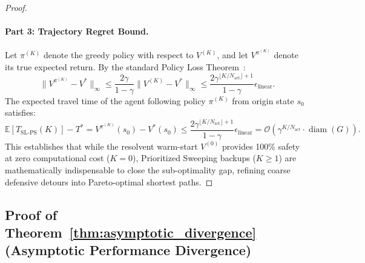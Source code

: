 \documentclass[11pt,a4paper]{article}
\begin{document}
\begin{proof}
\paragraph{Part 3: Trajectory Regret Bound.}
Let $\pi^{(K)}$ denote the greedy policy with respect to $V^{(K)}$, and let $V^{\pi^{(K)}}$ denote its true expected return. By the standard Policy Loss Theorem~\cite{sutton2018reinforcement}:
\begin{equation}
\|V^{\pi^{(K)}} - V^*\|_\infty \le \frac{2 \gamma}{1 - \gamma} \|V^{(K)} - V^*\|_\infty \le \frac{2 \gamma^{\lfloor K / N_{\text{act}} \rfloor + 1}}{1 - \gamma} \epsilon_{\text{linear}}.
\end{equation}
The expected travel time of the agent following policy $\pi^{(K)}$ from origin state $s_0$ satisfies:
\begin{equation}
\mathbb{E}[T_{\text{SL-PS}}(K)] - T^* = V^{\pi^{(K)}}(s_0) - V^*(s_0) \le \frac{2 \gamma^{\lfloor K / N_{\text{act}} \rfloor + 1}}{1 - \gamma} \epsilon_{\text{linear}} = \mathcal{O}\left( \gamma^{K / N_{\text{act}}} \cdot \operatorname{diam}(G) \right).
\end{equation}
This establishes that while the resolvent warm-start $V^{(0)}$ provides 100\% safety at zero computational cost ($K = 0$), Prioritized Sweeping backups ($K \ge 1$) are mathematically indispensable to close the sub-optimality gap, refining coarse defensive detours into Pareto-optimal shortest paths.
\end{proof}

\subsection{Proof of Theorem~\ref{thm:asymptotic_divergence} (Asymptotic Performance Divergence)}
\label{subsec:proof_thm4}
\end{document}
